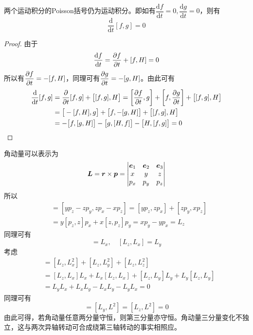 \begin{theorem}[Poisson定理]
两个运动积分的Poisson括号仍为运动积分。即如有$\dfrac{\mathrm{d} f}{\mathrm{d} t} = 0,\dfrac{\mathrm{d} g}{\mathrm{d} t} = 0$，则有
\begin{equation*}
	\frac{\mathrm{d}}{\mathrm{d} t} [f,g] = 0
\end{equation*}
\end{theorem}
\begin{proof}
由于
\begin{equation*}
	\frac{\mathrm{d} f}{\mathrm{d} t} = \frac{\partial f}{\partial t} + [f,H] = 0
\end{equation*}
所以有$\dfrac{\partial f}{\partial t} = -[f,H]$，同理可有$\dfrac{\partial g}{\partial t} = -[g,H]$。由此可有
\begin{align*}
	\frac{\mathrm{d}}{\mathrm{d} t} [f,g] & = \frac{\partial}{\partial t}[f,g] + \big[[f,g],H\big] = \left[\frac{\partial f}{\partial t},g\right] + \left[f,\frac{\partial g}{\partial t}\right] + \big[[f,g],H\big] \\
	& = \big[-[f,H],g\big] + \big[f,-[g,H]\big] + \big[[f,g],H\big] \\
	& = -\big[f,[g,H]\big] - \big[g,[H,f]\big] - \big[H,[f,g]\big] = 0 \qedhere
\end{align*}
\end{proof}

\begin{example}[角动量的Poisson括号]
角动量可以表示为
\begin{equation*}
	\boldsymbol{L} = \boldsymbol{r} \times \boldsymbol{p} = \begin{vmatrix} \boldsymbol{e}_1 & \boldsymbol{e}_2 & \boldsymbol{e}_3 \\ x & y & z \\ p_x & p_y & p_z \end{vmatrix}
\end{equation*}
所以
\begin{align*}
	[L_x,L_y] & = [yp_z-zp_y,zp_x-xp_z] = [yp_z,zp_x] + [zp_y,xp_z] \\
	& = y[p_z,z]p_x + x[z,p_z] p_y = xp_y-yp_x = L_z
\end{align*}
同理可有
\begin{equation*}
	[L_y,L_z] = L_x,\quad [L_z,L_x] = L_y
\end{equation*}
考虑
\begin{align*}
	[L_z,L^2] & = [L_z,L_x^2] + [L_z,L_y^2] + [L_z,L_z^2] \\
	& = [L_z,L_x]L_x + L_x[L_z,L_x] + [L_z,L_y]L_y + L_y[L_z,L_y] \\
	& = L_yL_x + L_xL_y - L_xL_y - L_yL_x = 0
\end{align*}
同理可有
\begin{equation*}
	[L_x,L^2] = [L_y,L^2] = [L_z,L^2] = 0
\end{equation*}
由此可得，若角动量任意两分量守恒，则第三分量亦守恒。角动量三分量变化不独立，这与两次异轴转动可合成绕第三轴转动的事实相照应。
\end{example}

